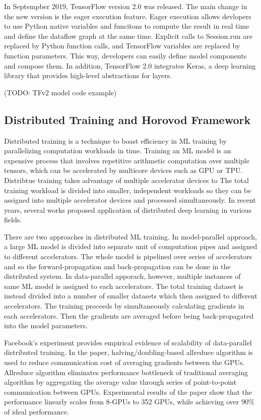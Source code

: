 In Septempber 2019, TensorFlow version 2.0 was released\cite{tf2announce}.
The main change in the new version is the eager execution feature.
Eager execution allows devlopers to use Python native variables
and funcitons to compute the result in real time and define the
dataflow graph at the same time.
Explicit calls to Session.run are replaced by Python function calls,
and TensorFlow variables are replaced by function parameters.
This way, developers can easily define model components
and compose them. 
In addition, TensorFlow 2.0 integrates Keras\cite{keras},
a deep learning library that provides high-level abstractions for layers.

(TODO: TFv2 model code example)

\subsection{Distributed Training and Horovod Framework}

Distributed training is a technique to boast efficiency in ML training
by parallelizing computation workloads in time.
Training an ML model is an expensive process that involves repetitive
arithmetic computation over multiple tensors,
which can be accelerated by multicore devices such as GPU or TPU. 
Distribtue training takes advantage of multiple accelerator devices to
The total training workload is divided into smaller, independent workloads
so they can be assigned into multiple accelerator devices and
processed simultaneously. 
In recent years, several works proposed application of distributed
deep learning in various fields.

There are two approaches in distributed ML training.
In model-parallel approach, a large ML model is divided into separate unit
of computation pipes and assigned to different accelerators. The whole model
is pipelined over series of accelerators and so the forward-propagation and
back-propagation can be done in the distributed system.
In data-parallel apporach, however, multiple instances of same ML model
is assigned to each accelerators. The total training dataset is instead
divided into a number of smaller datasets which then assigned to different
accelerators. The training proceeds by simultaneously calculating gradients
in each accelerators. Then the gradients are averaged before being 
back-propagated into the model parameters.

Facebook's experiment \cite{facebook2018} provides empirical evidence of
scalability of data-parallel distributed training. In the paper, 
halving/doubling-based allreduce algorithm is used to reduce communication cost 
of averaging gradients between the GPUs. 
Allreduce algorithm eliminates performance bottleneck of traditional
averaging algorithm by aggregating the average value through series of
point-to-point communication between GPUs. 
Experimental results of the paper show that the performance linearly
scales from 8-GPUs to 352 GPUs, while achieving over 90\% of ideal performance.

